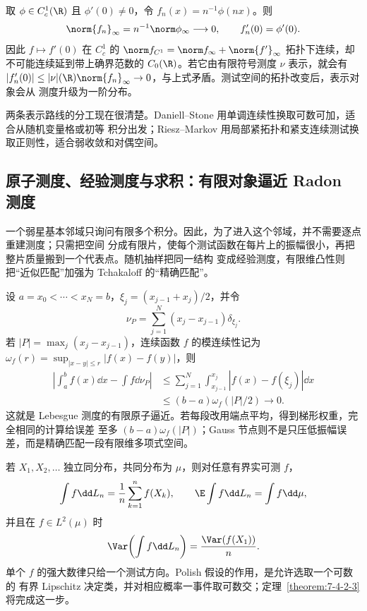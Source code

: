 \begin{example}[非正泛函]\label{ex:7-4-1-3}
取 $\phi\in C_c^1(\R)$ 且 $\phi'(0)\ne0$，令
$f_n(x)=n^{-1}\phi(nx)$。则
\[
 \norm{f_n}_\infty=n^{-1}\norm\phi_\infty\longrightarrow0,
 \qquad f_n'(0)=\phi'(0).
\]
因此 $f\mapsto f'(0)$ 在 $C_c^1$ 的
$\norm f_{C^1}=\norm f_\infty+\norm{f'}_\infty$ 拓扑下连续，却不可能连续延到带上确界范数的
$C_0(\R)$。若它由有限符号测度 $\nu$ 表示，就会有
$|f_n'(0)|\le|\nu|(\R)\norm{f_n}_\infty\to0$，与上式矛盾。测试空间的拓扑改变后，表示对象会从
测度升级为一阶分布。
\end{example}

两条表示路线的分工现在很清楚。Daniell--Stone 用单调连续性换取可数可加，适合从随机变量格或初等
积分出发；Riesz--Markov 用局部紧拓扑和紧支连续测试换取正则性，适合弱收敛和对偶空间。

\subsection{原子测度、经验测度与求积：有限对象逼近 Radon 测度}\label{subsec:7-4-2}

一个弱星基本邻域只询问有限多个积分。因此，为了进入这个邻域，并不需要逐点重建测度；只需把空间
分成有限片，使每个测试函数在每片上的振幅很小，再把整片质量搬到一个代表点。随机抽样把同一结构
变成经验测度，有限维凸性则把“近似匹配”加强为 Tchakaloff 的“精确匹配”。

\begin{example}[Riemann 求积]\label{ex:7-4-2-1}
设 $a=x_0<\cdots<x_N=b$，$\xi_j=(x_{j-1}+x_j)/2$，并令
\[
 \nu_P=\sum_{j=1}^N(x_j-x_{j-1})\delta_{\xi_j}.
\]
若 $|P|=\max_j(x_j-x_{j-1})$，连续函数 $f$ 的模连续性记为
$\omega_f(r)=\sup_{|x-y|\le r}|f(x)-f(y)|$，则
\begin{align*}
 \left|\int_a^bf(x)\dd x-\int f\dd\nu_P\right|
 &\le\sum_{j=1}^N\int_{x_{j-1}}^{x_j}|f(x)-f(\xi_j)|\dd x\\
 &\le(b-a)\omega_f(|P|/2)\longrightarrow0.
\end{align*}
这就是 Lebesgue 测度的有限原子逼近。若每段改用端点平均，得到梯形权重，完全相同的计算给误差
至多 $(b-a)\omega_f(|P|)$；Gauss 节点则不是只压低振幅误差，而是精确匹配一段有限维多项式空间。
\end{example}

\begin{example}[经验测度的测试积分]\label{ex:7-4-2-2}
若 $X_1,X_2,\ldots$ 独立同分布，共同分布为 $\mu$，则对任意有界实可测 $f$，
\[
 \int f\dd L_n=\frac1n\sum_{k=1}^nf(X_k),\qquad
 \E\int f\dd L_n=\int f\dd\mu,
\]
并且在 $f\in L^2(\mu)$ 时
\[
 \Var\!\left(\int f\dd L_n\right)=\frac{\Var(f(X_1))}{n}.
\]
单个 $f$ 的强大数律只给一个测试方向。Polish 假设的作用，是允许选取一个可数的
有界 Lipschitz 决定类，并对相应概率一事件取可数交；定理~\ref{theorem:7-4-2-3} 将完成这一步。
\end{example}

